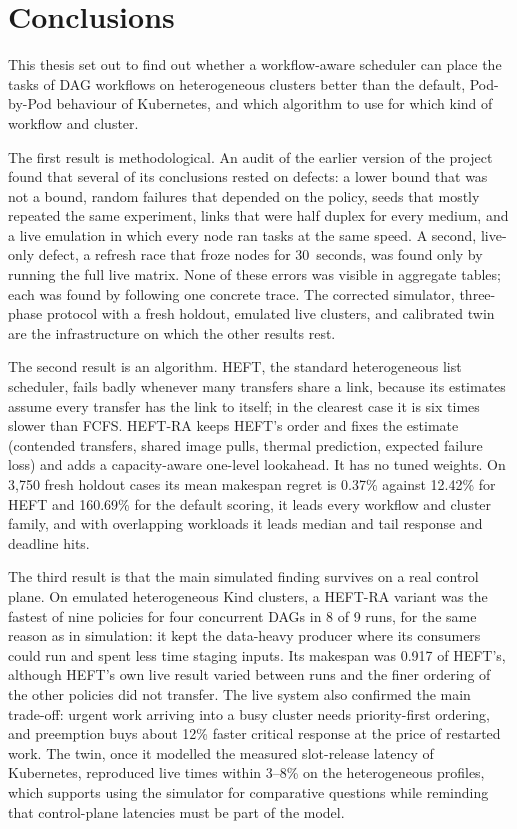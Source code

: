 \documentclass[12pt,a4paper]{report}
\begin{document}
\chapter{Conclusions}
\label{ch:conclusion}

This thesis set out to find out whether a workflow-aware scheduler can
place the tasks of DAG workflows on heterogeneous clusters better than the
default, Pod-by-Pod behaviour of Kubernetes, and which algorithm to use
for which kind of workflow and cluster.

The first result is methodological. An audit of the earlier version of the
project found that several of its conclusions rested on defects: a lower
bound that was not a bound, random failures that depended on the policy,
seeds that mostly repeated the same experiment, links that were half
duplex for every medium, and a live emulation in which every node ran
tasks at the same speed. A second, live-only defect, a refresh race that
froze nodes for 30~seconds, was found only by running the full live
matrix. None of these errors was visible in aggregate tables; each was
found by following one concrete trace. The corrected simulator,
three-phase protocol with a fresh holdout, emulated live clusters, and
calibrated twin are the infrastructure on which the other results rest.

The second result is an algorithm. HEFT, the standard heterogeneous list
scheduler, fails badly whenever many transfers share a link, because its
estimates assume every transfer has the link to itself; in the clearest
case it is six times slower than FCFS. HEFT-RA keeps HEFT's order and
fixes the estimate (contended transfers, shared image pulls, thermal
prediction, expected failure loss) and adds a capacity-aware one-level
lookahead. It has no tuned weights. On 3,750 fresh holdout cases its mean
makespan regret is 0.37\% against 12.42\% for HEFT and 160.69\% for the
default scoring, it leads every workflow and cluster family, and with
overlapping workloads it leads median and tail response and deadline
hits.

The third result is that the main simulated finding survives on a real
control plane. On emulated heterogeneous Kind clusters, a HEFT-RA variant
was the fastest of nine policies for four concurrent DAGs in 8 of 9 runs,
for the same reason as in simulation: it kept the data-heavy producer
where its consumers could run and spent less time staging inputs. Its
makespan was 0.917 of HEFT's, although HEFT's own live result varied
between runs and the finer ordering of the other policies did not
transfer. The live system also confirmed the main trade-off: urgent work
arriving into a busy cluster needs priority-first ordering, and
preemption buys about 12\% faster critical response at the price of
restarted work. The twin, once it modelled the measured slot-release
latency of Kubernetes, reproduced live times within 3--8\% on the
heterogeneous profiles, which supports using the simulator for
comparative questions while reminding that control-plane latencies must
be part of the model.
\end{document}
